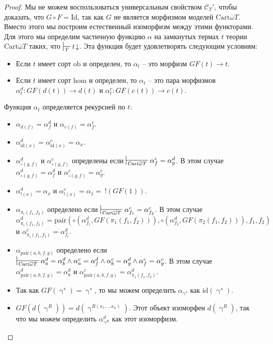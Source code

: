 \documentclass[reqno]{amsart}
\theoremstyle{definition}
\theoremstyle{remark}
\newcommand{\cat}[1]{\mathcal{#1}}
\newcommand{\fs}[1]{\mathrm{#1}}
\begin{document}
\begin{proof}
Мы не можем воспользоваться универсальным свойством $\cat{C}_T'$, чтобы доказать, что $G \circ F = \fs{Id}$, так как $G$ не является морфизмом моделей $\mathrm{Cart} \overline{\omega} T$.
Вместо этого мы построим естественный изоморфизм между этими функторами.
Для этого мы определим частичную функцию $\alpha$ на замкнутых термах $t$ теории $\mathrm{Cart} \overline{\omega} T$ таких, что $\sststile{T}{} t\!\downarrow$.
Эта функция будет удовлетворять следующим условиям:
\begin{itemize}
\item Если $t$ имеет сорт $\fs{ob}$ и определен, то $\alpha_t$ -- это морфизм $GF(t) \to t$.
\item Если $t$ имеет сорт $\fs{hom}$ и определен, то $\alpha_t$ -- это пара морфизмов $\alpha_t^d : GF(d(t)) \to d(t)$ и $\alpha_t^c : GF(c(t)) \to c(t)$.
\end{itemize}
Функция $\alpha_t$ определяется рекурсией по $t$:
\begin{itemize}
\item $\alpha_{d(f)} = \alpha^d_f$ и $\alpha_{c(f)} = \alpha^c_f$.
\item $\alpha^d_{\mathrm{id}(x)} = \alpha^c_{\mathrm{id}(x)} = \alpha_x$.
\item $\alpha^d_{\circ(g,f)}$ и $\alpha^c_{\circ(g,f)}$ определены если $\sststile{\mathrm{Cart} \overline{\omega} T}{} \alpha^c_f = \alpha^d_g$.
В этом случае $\alpha^d_{\circ(g,f)} = \alpha^d_f$ и $\alpha^c_{\circ(g,f)} = \alpha^c_g$.
\item $\alpha^d_{!(x)} = \alpha_x$ и $\alpha^c_{!(x)} = \alpha_1 =\ !(GF(1))$.
\item $\alpha_{\pi_i(f_1,f_2)}$ определено если $\sststile{\mathrm{Cart} \overline{\omega} T}{} \alpha^c_{f_1} = \alpha^c_{f_2}$.
В этом случае $\alpha^d_{\pi_i(f_1,f_2)} = \fs{pair}(\circ(\alpha^d_{f_1},GF(\pi_1(f_1,f_2))),\circ(\alpha^d_{f_2},GF(\pi_2(f_1,f_2))),f_1,f_2)$ и $\alpha^c_{\pi_i(f_1,f_2)} = \alpha^d_{f_i}$.
\item $\alpha_{\fs{pair}(a,b,f,g)}$ определено если $\sststile{\mathrm{Cart} \overline{\omega} T}{} \alpha^d_a = \alpha^d_b \land \alpha^c_a = \alpha^d_f \land \alpha^c_b = \alpha^d_g \land \alpha^c_f = \alpha^c_g$.
В этом случае $\alpha^d_{\fs{pair}(a,b,f,g)} = \alpha^d_a$ и $\alpha^c_{\fs{pair}(a,b,f,g)} = \alpha^d_{\pi_1(f_1,f_2)}$.
\item Так как $GF(\upgamma^s) = \upgamma^s$, то мы можем определить $\alpha_{\upgamma^s}$ как $\mathrm{id}(\upgamma^s)$.
\item $GF(d(\upgamma^R)) = d(\upgamma^{R(x_1, \ldots x_n)})$. Этот объект изоморфен $d(\upgamma^R)$, так что мы можем определить $\alpha^d_{\upgamma^R}$ как этот изоморфизм.

\end{itemize}
\end{proof}
\end{document}
